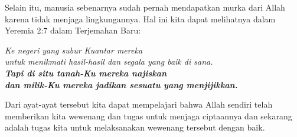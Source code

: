 \documentclass[12pt, answers]{exam}
\begin{document}
\begin{questions}
\begin{solution}
\begin{parts}
        Selain itu, manusia sebenarnya sudah pernah mendapatkan murka dari Allah
        karena tidak menjaga lingkungannya. Hal ini kita dapat melihatnya dalam
        Yeremia 2:7 dalam Terjemahan Baru:
        \begin{displayquote}
            \emph{Ke negeri yang subur Kuantar mereka \\
            untuk menikmati hasil-hasil dan segala yang baik di sana. \\
            \textbf{Tapi di situ tanah-Ku mereka najiskan \\
            dan milik-Ku mereka jadikan sesuatu yang menjijikkan.}}
        \end{displayquote} 

        Dari ayat-ayat tersebut kita dapat mempelajari bahwa Allah sendiri telah
        memberikan kita wewenang dan tugas untuk menjaga ciptaannya dan sekarang
        adalah tugas kita untuk melaksanakan wewenang tersebut dengan baik.
        \end{parts}
        \end{solution}
    \end{questions}

    \pagebreak

    \printbibliography
\end{document}
